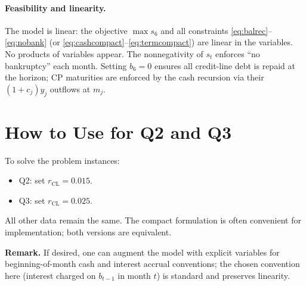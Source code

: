 \documentclass[11pt]{article}
\begin{document}
\paragraph{Feasibility and linearity.} The model is linear: the objective $\max s_6$ and all constraints \eqref{eq:balrec}--\eqref{eq:nobank} (or \eqref{eq:cashcompact}--\eqref{eq:termcompact}) are linear in the variables. No products of variables appear. The nonnegativity of $s_t$ enforces ``no bankruptcy'' each month. Setting $b_6=0$ ensures all credit-line debt is repaid at the horizon; CP maturities are enforced by the cash recursion via their $(1+c_j)y_j$ outflows at $m_j$.

\section*{How to Use for Q2 and Q3}

To solve the problem instances:
\begin{itemize}
\item Q2: set $r_{\mathrm{CL}}=0.015$.
\item Q3: set $r_{\mathrm{CL}}=0.025$.
\end{itemize}
All other data remain the same. The compact formulation is often convenient for implementation; both versions are equivalent.

\bigskip
\noindent\textbf{Remark.} If desired, one can augment the model with explicit variables for beginning-of-month cash and interest accrual conventions; the chosen convention here (interest charged on $b_{t-1}$ in month $t$) is standard and preserves linearity.
\end{document}
